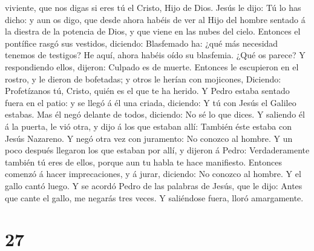viviente, que nos digas si eres tú el Cristo, Hijo de Dios.
 Jesús le dijo: Tú lo has dicho: y aun os digo, que desde
ahora habéis de ver al Hijo del hombre sentado á la diestra de la
potencia de Dios, y que viene en las nubes del cielo. 
Entonces el pontífice rasgó sus vestidos, diciendo: Blasfemado ha: ¿qué
más necesidad tenemos de testigos? He aquí, ahora habéis oído su
blasfemia.  ¿Qué os parece? Y respondiendo ellos,
dijeron: Culpado es de muerte.  Entonces le escupieron en
el rostro, y le dieron de bofetadas; y otros le herían con mojicones,
 Diciendo: Profetízanos tú, Cristo, quién es el que te ha
herido.  Y Pedro estaba sentado fuera en el patio: y se
llegó á él una criada, diciendo: Y tú con Jesús el Galileo estabas.
 Mas él negó delante de todos, diciendo: No sé lo que
dices.  Y saliendo él á la puerta, le vió otra, y dijo á
los que estaban allí: También éste estaba con Jesús Nazareno.
 Y negó otra vez con juramento: No conozco al hombre.
 Y un poco después llegaron los que estaban por allí, y
dijeron á Pedro: Verdaderamente también tú eres de ellos, porque aun tu
habla te hace manifiesto.  Entonces comenzó á hacer
imprecaciones, y á jurar, diciendo: No conozco al hombre. Y el gallo
cantó luego.  Y se acordó Pedro de las palabras de Jesús,
que le dijo: Antes que cante el gallo, me negarás tres veces. Y
saliéndose fuera, lloró amargamente.

\hypertarget{section-26}{%
\section{27}\label{section-26}}


